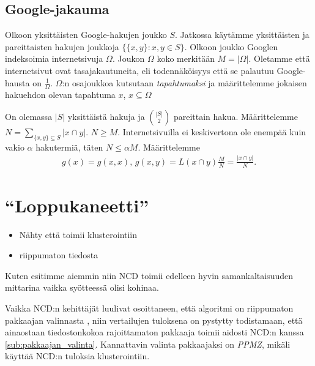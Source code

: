 \documentclass[12pt,finnish]{tktltiki2}
\theoremstyle{definition}
\theoremstyle{remark}
\begin{document}
    \subsection{Google-jakauma} %
    \label{sub:google_jakauma}
      Olkoon yksittäisten Google-hakujen joukko $S$. Jatkossa käytämme yksittäisten ja pareittaisten hakujen joukkoja $\{\{x,y\}:x,y \in S\}$. Olkoon joukko Googlen indeksoimia internetsivuja $\Omega$. Joukon $\Omega$ koko merkitään $M = |\Omega|$.
      Oletamme että internetsivut ovat tasajakautuneita, eli todennäköisyys että se palautuu Google-hausta on $\frac{1}{\Omega}$. $\Omega$:n osajoukkoa kutsutaan \emph{tapahtumaksi} ja määrittelemme jokaisen hakuehdon olevan tapahtuma $x$, $x \subseteq \Omega$

      On olemassa $|S|$ yksittäistä hakuja ja $\binom{|S|}{2}$  pareittain hakua. Määrittelemme $N = \sum_{\{x,y\} \subseteq S} |x \cap y|$. $N \geq M$. Internetsivuilla ei keskivertona ole enempää kuin vakio $\alpha$ hakutermiä, täten $N \leq \alpha{}M$.
      Määrittelemme
      \begin{align}
        g(x) = g(x,x),\, g(x,y) = L(x \cap y)\frac{M}{N} = \frac{|x\cap y|}{N}.
      \end{align}



\section{``Loppukaneetti''} %
\label{sec:loppukaneetti}

\begin{itemize}
  \item Nähty että toimii klusterointiin
  \item riippumaton tiedosta
\end{itemize}

Kuten esitimme aiemmin niin NCD toimii edelleen hyvin samankaltaisuuden mittarina vaikka syötteessä olisi kohinaa.

Vaikka NCD:n kehittäjät luulivat osoittaneen, että algoritmi on riippumaton pakkaajan valinnasta \cite{CV05}, niin vertailujen tuloksena on pystytty todistamaan, että ainaostaan tiedostonkokoa rajoittamaton pakkaaja toimii aidosti NCD:n kanssa \ref{sub:pakkaajan_valinta}. Kannattavin valinta pakkaajaksi on \emph{PPMZ}, mikäli käyttää NCD:n tuloksia klusterointiin.
\end{document}
